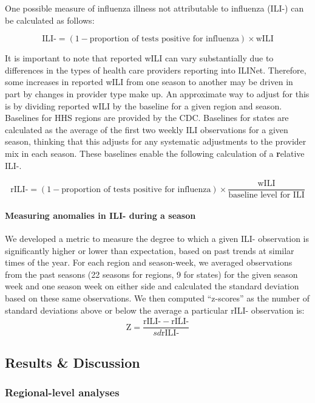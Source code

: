 \documentclass[]{article}
\let\oldparagraph\paragraph
\renewcommand{\paragraph}[1]{\oldparagraph{#1}\mbox{}}
\begin{document}
One possible measure of influenza illness not attributable to influenza
(ILI-) can be calculated as follows:

\[\text{ILI-} = (1 - \text{proportion of tests positive for influenza}) \times \text{wILI}\]

It is important to note that reported wILI can vary substantially due to
differences in the types of health care providers reporting into ILINet.
Therefore, some increases in reported wILI from one season to another
may be driven in part by changes in provider type make up. An
approximate way to adjust for this is by dividing reported wILI by the
baseline for a given region and season. Baselines for HHS regions are
provided by the CDC. Baselines for states are calculated as the average
of the first two weekly ILI observations for a given season, thinking
that this adjusts for any systematic adjustments to the provider mix in
each season. These baselines enable the following calculation of a
\textbf{r}elative ILI-.

\[\text{rILI-} = (1 - \text{proportion of tests positive for influenza}) \times \frac{\text{wILI}}{\text{baseline level for ILI}}\]

\hypertarget{measuring-anomalies-in-ili--during-a-season}{%
\paragraph{Measuring anomalies in ILI- during a
season}\label{measuring-anomalies-in-ili--during-a-season}}

We developed a metric to measure the degree to which a given ILI-
observation is significantly higher or lower than expectation, based on
past trends at similar times of the year. For each region and
season-week, we averaged observations from the past seasons (22 seasons
for regions, 9 for states) for the given season week and one season week
on either side and calculated the standard deviation based on these same
observations. We then computed ``z-scores'' as the number of standard
deviations above or below the average a particular rILI- observation is:
\[\text{Z} =  \frac{\text{rILI-} - \overline{\text{rILI-}}}{sd{\text{rILI-}}}\]

\hypertarget{results-discussion}{%
\subsection{Results \& Discussion}\label{results-discussion}}

\hypertarget{regional-level-analyses}{%
\subsubsection{Regional-level analyses}\label{regional-level-analyses}}
\end{document}
